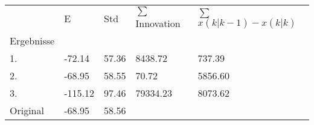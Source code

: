     \begin{tabular}{l|l|l|l|l}

               & E         & Std      & \(\sum\) Innovation & \(\sum\) \(x(k|k-1)-x(k|k)\) \\
    \hhline{=|=|=|=|=}

    Ergebnisse &           &          &            & \\
    1.         &       -72.14  &        57.36 &      8438.72   &       737.39 \\
    2.         &       -68.95  &        58.55 &        70.72   &      5856.60 \\
    3.         &      -115.12  &        97.46 &     79334.23   &      8073.62 \\
    \hline
    Original   &       -68.95 &        58.56 &  & \\
    \end{tabular}
